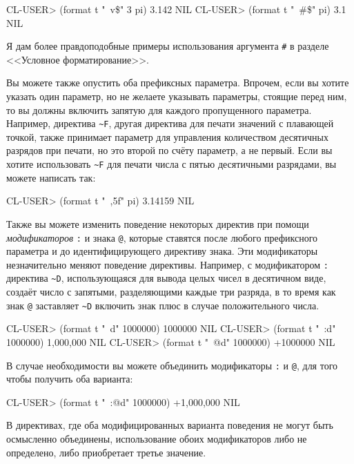 \begin{myverb}
CL-USER> (format t "~v\$" 3 pi)
3.142
NIL
CL-USER> (format t "~#\$" pi)
3.1
NIL
\end{myverb}

Я дам более правдоподобные примеры использования аргумента \lstinline!#! в
разделе <<Условное форматирование>>.

Вы можете также опустить оба префиксных параметра. Впрочем, если вы хотите указать один
параметр, но не желаете указывать параметры, стоящие перед ним, то вы должны включить
запятую для каждого пропущенного параметра. Например, директива \lstinline!~F!, другая
директива для печати значений с плавающей точкой, также принимает параметр для управления
количеством десятичных разрядов при печати, но это второй по счёту параметр, а не
первый. Если вы хотите использовать \lstinline!~F! для печати числа с пятью десятичными
разрядами, вы можете написать так:

\begin{myverb}
CL-USER> (format t "~,5f" pi)
3.14159
NIL
\end{myverb}

Также вы можете изменить поведение некоторых директив при помощи \textit{модификаторов}
\lstinline!:! и знака \lstinline!@!, которые ставятся после любого префиксного параметра и
до идентифицирующего директиву знака. Эти модификаторы незначительно меняют поведение
директивы. Например, с модификатором \lstinline!:! директива \lstinline!~D!,
использующаяся для вывода целых чисел в десятичном виде, создаёт число с запятыми,
разделяющими каждые три разряда, в то время как знак \lstinline!@! заставляет
\lstinline!~D!  включить знак плюс в случае положительного числа.

\begin{myverb}
CL-USER> (format t "~d" 1000000)
1000000
NIL
CL-USER> (format t "~:d" 1000000)
1,000,000
NIL
CL-USER> (format t "~@d" 1000000)
+1000000
NIL
\end{myverb}

В случае необходимости вы можете объединить модификаторы \lstinline!:! и \lstinline!@!,
для того чтобы получить оба варианта:

\begin{myverb}
CL-USER> (format t "~:@d" 1000000)
+1,000,000
NIL
\end{myverb}

В директивах, где оба модифицированных варианта поведения не могут быть осмысленно
объединены, использование обоих модификаторов либо не определено, либо приобретает третье
значение.

